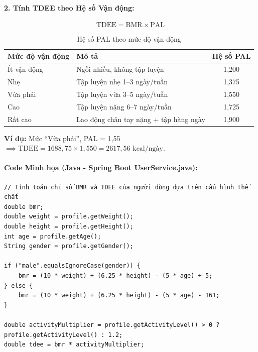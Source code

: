\documentclass[12pt,a4paper]{article}
\begin{document}
\paragraph{2. Tính TDEE theo Hệ số Vận động:}
\begin{equation}
    \text{TDEE} = \text{BMR} \times \text{PAL}
\end{equation}
\begin{table}[H]
    \centering
    \caption{Hệ số PAL theo mức độ vận động}
    \label{tab:pal}
    \begin{tabularx}{0.8\textwidth}{lXc}
        \toprule
        \textbf{Mức độ vận động} & \textbf{Mô tả} & \textbf{Hệ số PAL} \\
        \midrule
        Ít vận động     & Ngồi nhiều, không tập luyện                 & 1,200 \\
        Nhẹ             & Tập luyện nhẹ 1--3 ngày/tuần                & 1,375 \\
        Vừa phải        & Tập luyện vừa 3--5 ngày/tuần                & 1,550 \\
        Cao             & Tập luyện nặng 6--7 ngày/tuần               & 1,725 \\
        Rất cao         & Lao động chân tay nặng + tập hàng ngày      & 1,900 \\
        \bottomrule
    \end{tabularx}
\end{table}

\noindent\textbf{Ví dụ:} Mức ``Vừa phải'', PAL = 1,55 $\implies \text{TDEE} = 1688{,}75 \times 1{,}550 = 2617{,}56 \text{ kcal/ngày}$.

\paragraph{Code Minh họa (Java - Spring Boot UserService.java):}
\begin{verbatim}
// Tính toán chỉ số BMR và TDEE của người dùng dựa trên cấu hình thể chất
double bmr;
double weight = profile.getWeight();
double height = profile.getHeight();
int age = profile.getAge();
String gender = profile.getGender();

if ("male".equalsIgnoreCase(gender)) {
    bmr = (10 * weight) + (6.25 * height) - (5 * age) + 5;
} else {
    bmr = (10 * weight) + (6.25 * height) - (5 * age) - 161;
}

double activityMultiplier = profile.getActivityLevel() > 0 ? profile.getActivityLevel() : 1.2;
double tdee = bmr * activityMultiplier;
\end{verbatim}
\end{document}
